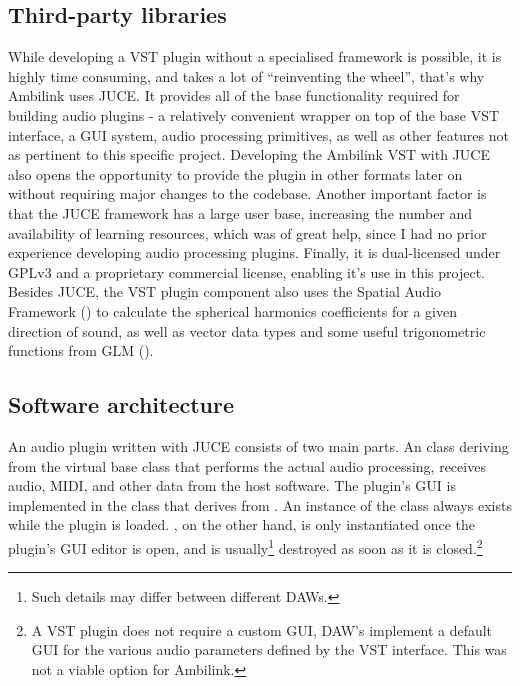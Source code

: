 \subsection{Third-party libraries}
While developing a VST plugin without a specialised framework is possible, it is highly time consuming,
and takes a lot of ``reinventing the wheel'', that's why Ambilink uses JUCE.
It provides all of the base functionality required for building audio plugins
- a relatively convenient wrapper on top of the base VST interface, a GUI system,
 audio processing primitives, as well as other features not as pertinent to this specific project.
Developing the Ambilink VST with JUCE also opens the opportunity to provide the plugin in other formats 
later on without requiring major changes to the codebase.
Another important factor is that the JUCE framework has a large user base, increasing the number
and availability of learning resources, which was of great help, since I had no prior experience developing audio processing plugins.
Finally, it is dual-licensed under GPLv3 and a proprietary commercial license,
enabling it's use in this project. Besides JUCE, the VST plugin component also uses the Spatial Audio Framework (\cite{saf_repo}) to calculate the spherical harmonics coefficients for a given direction of sound,
as well as vector data types and some useful trigonometric functions from GLM (\cite{glm_repo}).

\subsection{Software architecture}
An audio plugin written with JUCE consists of two main parts. An  class 
deriving from the  virtual base class that performs the actual audio processing,
receives audio, MIDI, and other data from the host software. 
The plugin's GUI is implemented in the 
class that derives from .
An instance of the  class always exists while the plugin is loaded.
, on the other hand, is only instantiated once the plugin's GUI editor is open, and is
usually\footnote{Such details may differ between different DAWs.}
destroyed as soon as it is closed.\footnote{A VST plugin does not require a custom GUI, DAW's implement a default GUI for the various audio parameters defined by the VST interface. This was not a viable option for Ambilink.}

